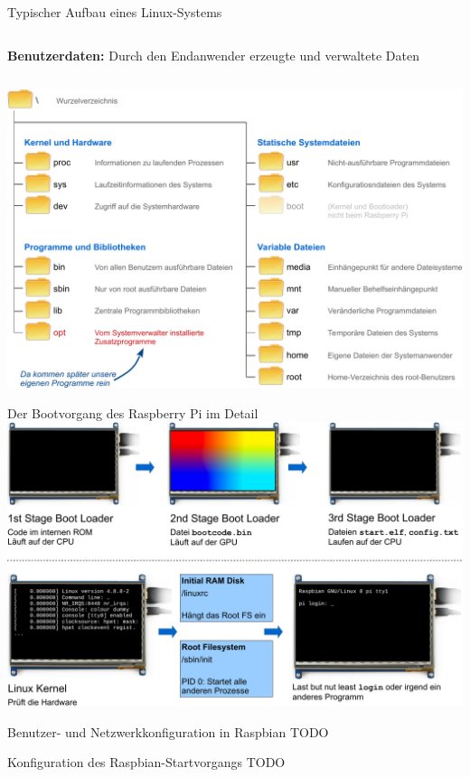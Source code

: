 {\begin{frame}[allowframebreaks]{Typischer Aufbau eines Linux-Systems}
{\begin{columns}[T, onlytextwidth]
            \parbox{\linewidth}{
                \textbf{Benutzerdaten:} Durch den Endanwender erzeugte und verwaltete
                Daten
            }
        \end{columns}
    }

    \framebreak
    \includegraphics[width=\textwidth]{8-linux/img/fhs-verzeichnisse}
\end{frame}
}

\begin{frame}{Der Bootvorgang des Raspberry Pi im Detail}
    \includegraphics[width=\textwidth]{8-linux/img/pi-bootvorgang}
\end{frame}

\begin{frame}{Benutzer- und Netzwerkkonfiguration in Raspbian}
    TODO
\end{frame}

\begin{frame}{Konfiguration des Raspbian-Startvorgangs}
    TODO
\end{frame}

